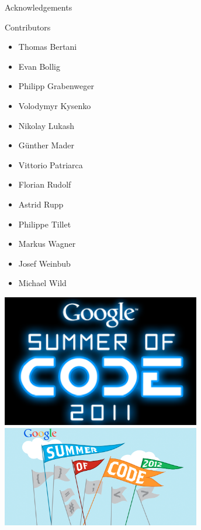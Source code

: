 


\begin{frame}{Acknowledgements}

 \begin{minipage}{0.5\textwidth}
  \begin{block}{Contributors}
    \begin{itemize}
     \item Thomas Bertani
     \item Evan Bollig
     \item Philipp Grabenweger
     \item Volodymyr Kysenko
     \item Nikolay Lukash
     \item G\"unther Mader
     \item Vittorio Patriarca
     \item Florian Rudolf
     \item Astrid Rupp
     \item Philippe Tillet
     \item Markus Wagner
     \item Josef Weinbub
     \item Michael Wild
    \end{itemize}
  \end{block}
 \end{minipage}
 \begin{minipage}{0.4\textwidth}
  \includegraphics[width=0.65\textwidth]{figures/gsoc2011.png}
  \vspace*{0.2cm} \\
  \includegraphics[width=0.65\textwidth]{figures/gsoc2012.png}

\end{minipage}
\end{frame}
